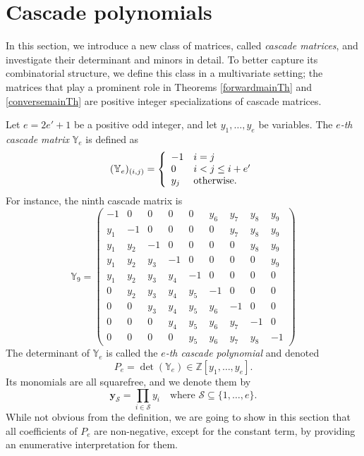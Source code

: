 \documentclass[11pt,twoside]{amsart}
\newcommand{\Z}{\mathbb Z}
\newcommand{\YY}{\mathbb Y}
\newcommand{\cS}{\mathcal{S}}
\def\by{{\mathbf y}}
\theoremstyle{definition}
\numberwithin{equation}{section}
\begin{document}
\section{Cascade polynomials}\label{SectionCascade}

In this section, we introduce a new class of matrices, called \emph{cascade matrices}, and investigate  their determinant and minors in detail.
To better capture its combinatorial structure, 
we define this class in a multivariate setting;
the matrices that play a prominent role in Theorems \ref{forwardmainTh} and \ref{conversemainTh}
are positive integer specializations of cascade matrices.

Let $e=2e'+1$ be a positive odd integer, and let $y_1, \ldots, y_e$ be variables.
The \emph{$e$-th cascade matrix}  $\YY_e$  is defined as
$$
(\YY_e)_{(i,j)}=\left\{\begin{array}{ll}
-1 & i=j \\
0  &  i < j \le i+e' \\
y_j & {\rm otherwise}.
\end{array} \right.
$$
For instance,  the ninth cascade matrix is
$$
\YY_9 =
\begin{pmatrix}
-1 & 0 & 0 & 0 & 0 & y_6 & y_7 & y_8 & y_9 \\
y_1 & -1 & 0 & 0 & 0 & 0 & y_7 & y_8 & y_9 \\
y_1 & y_2 & -1 & 0 & 0 & 0 & 0 & y_8 & y_9 \\
y_1 & y_2 & y_3 & -1 & 0 & 0 & 0 & 0 & y_9 \\
y_1 & y_2 & y_3 & y_4 & -1 & 0 & 0 & 0 & 0 \\
0 & y_2 & y_3 & y_4 & y_5 & -1 & 0 & 0 & 0 \\
0 & 0 & y_3 & y_4 & y_5 & y_6 & -1 & 0 & 0 \\
0 & 0 & 0 & y_4 & y_5 & y_6 & y_7 & -1 & 0 \\
0 & 0 & 0 & 0 & y_5 & y_6 & y_7 & y_8 & -1
\end{pmatrix}$$
The determinant of $\YY_e$ is called the \emph{$e$-th cascade polynomial} and denoted
$$
P_e = \det(\YY_e) \in \Z[y_1, \ldots, y_e].
$$
Its monomials are all squarefree, and we denote them by 
$$\by_\cS = \prod_{i \in \cS} y_i
\quad \text{where } \cS \subseteq \{1,\ldots,e\}.
$$
While  not obvious from the definition, 
we are going to show in this section that all coefficients of $P_e$ are non-negative, except for the constant term, 
by providing an enumerative interpretation for them.
\end{document}
